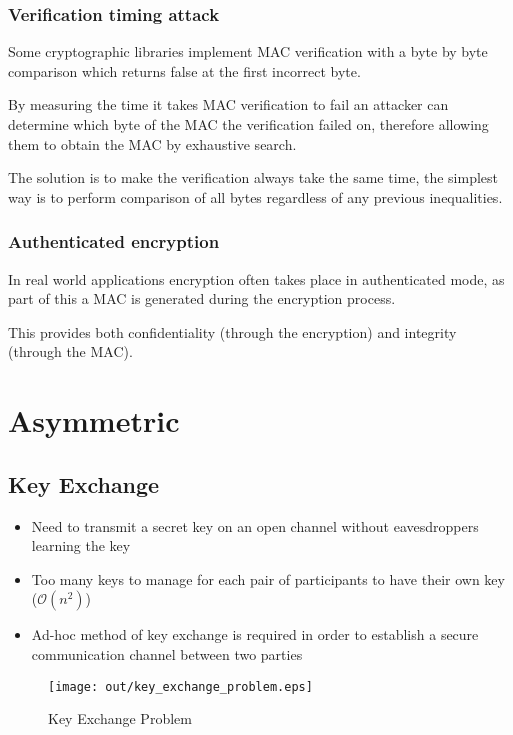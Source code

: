 \documentclass[a4paper]{article}
\begin{document}
\subsubsection{Verification timing attack}

Some cryptographic libraries implement MAC verification with a byte by byte
comparison which returns false at the first incorrect byte.

By measuring the time it takes MAC verification to fail an attacker can
determine which byte of the MAC the verification failed on, therefore allowing
them to obtain the MAC by exhaustive search.

The solution is to make the verification always take the same time, the simplest
way is to perform comparison of all bytes regardless of any previous
inequalities.

\subsubsection{Authenticated encryption}

In real world applications encryption often takes place in authenticated mode,
as part of this a MAC is generated during the encryption process.

This provides both confidentiality (through the encryption) and integrity
(through the MAC).

\section{Asymmetric}

\subsection{Key Exchange}

\begin{itemize}
  \item Need to transmit a secret key on an open channel without eavesdroppers
        learning the key
  \item Too many keys to manage for each pair of participants to have their own
        key ($\mathcal{O}(n^{2})$)
  \item Ad-hoc method of key exchange is required in order to establish a secure
        communication channel between two parties
\end{itemize}

\begin{figure}[h!]
  \centering
  \texttt{[image: out/key\_exchange\_problem.eps]}
  \caption{Key Exchange Problem}
  \label{fig:key_exchange_problem}
\end{figure}
\FloatBarrier
\end{document}
